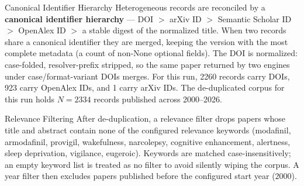 \documentclass[
  ignorenonframetext,
]{beamer}
\newcounter{none} %
\begin{document}
\begin{frame}[allowframebreaks]{Canonical Identifier Hierarchy}
\protect{}\label{canonical-identifier-hierarchy}
Heterogeneous records are reconciled by a \textbf{canonical identifier
hierarchy} --- DOI \(>\) arXiv ID \(>\) Semantic Scholar ID \(>\)
OpenAlex ID \(>\) a stable digest of the normalized title. When two
records share a canonical identifier they are merged, keeping the
version with the most complete metadata (a count of non-None optional
fields). The DOI is normalized: case-folded, resolver-prefix stripped,
so the same paper returned by two engines under case/format-variant DOIs
merges. For this run, 2260 records carry DOIs, 923 carry OpenAlex IDs,
and 1 carry arXiv IDs. The de-duplicated corpus for this run holds
\(N = 2334\) records published across 2000--2026.
\end{frame}

\begin{frame}[allowframebreaks]{Relevance Filtering}
\protect{}\label{relevance-filtering}
After de-duplication, a relevance filter drops papers whose title and
abstract contain none of the configured relevance keywords (modafinil,
armodafinil, provigil, wakefulness, narcolepsy, cognitive enhancement,
alertness, sleep deprivation, vigilance, eugeroic). Keywords are matched
case-insensitively; an empty keyword list is treated as no filter to
avoid silently wiping the corpus. A year filter then excludes papers
published before the configured start year (2000).
\end{frame}
\end{document}
